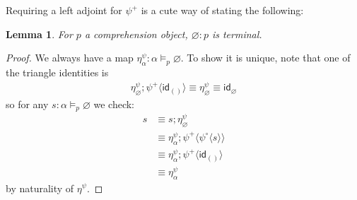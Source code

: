 \documentclass[10pt]{article}
\newtheorem{lemma}{Lemma}
\theoremstyle{definition}
\let\emptyset\varnothing
\newcommand{\id}{\mathsf{id}}
\newcommand\ApPlus[2]{\ensuremath{{#1}^+ \langle #2 \rangle }}
\newcommand\ApCirc[2]{\ensuremath{{#1}^\circ \langle #2 \rangle }}
\begin{document}
Requiring a left adjoint for $\psi^+$ is a cute way of stating the following:
\begin{lemma}
For $p$ a comprehension object, $\emptyset : p$ is terminal.
\end{lemma}
\begin{proof}
We always have a map $\eta^\psi_\alpha : \alpha \vDash_p \emptyset$. To show it is unique, note that one of the triangle identities is 
\begin{align*}
\eta^\psi_\emptyset ; \ApPlus{\psi}{\id_{()}} \equiv \eta^\psi_\emptyset \equiv \id_\emptyset
\end{align*}
so for any $s : \alpha \vDash_p \emptyset$ we check:
\begin{align*}
s 
&\equiv s ; \eta^\psi_\emptyset \\
&\equiv \eta^\psi_\alpha ; \ApPlus{\psi}{\ApCirc{\psi}{s}} \\
&\equiv \eta^\psi_\alpha ; \ApPlus{\psi}{\id_{()}} \\
&\equiv \eta^\psi_\alpha
\end{align*}
by naturality of $\eta^\psi$.
\end{proof}
\end{document}
